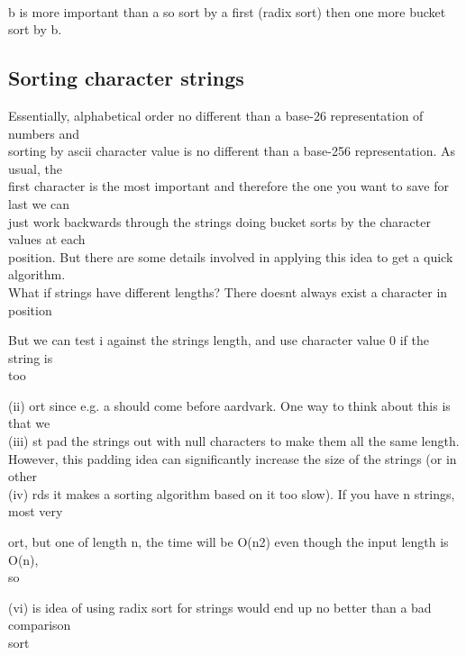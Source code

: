 \documentclass[a4paper,11pt]{article}
\begin{document}
\begin{flushleft}
{\\ }
{
b is more important than a so sort by a first (radix sort) then one more bucket sort by b.
\\ \subsection{Sorting character strings}
}
{
\raggedleft
Essentially, alphabetical order no different than a base-26 representation of numbers and
\\ sorting by ascii character value is no different than a base-256 representation. As usual, the
\\ first character is the most important and therefore the one you want to save for last we can
\\ just work backwards through the strings doing bucket sorts by the character values at each
\\ position. But there are some details involved in applying this idea to get a quick algorithm.
\\ What if strings have different lengths? There doesnt always exist a character in position
\\ }
{
}
\begin{enumerate}[label = (\alph*)]{
\item
But we can test i against the strings length, and use character value 0 if the string is
\\ too
}\end{enumerate}
{
\raggedleft
(ii) ort since e.g. a should come before aardvark. One way to think about this is that we
\\ }
{
(iii) st pad the strings out with null characters to make them all the same length.
\\ }
{
\raggedleft
However, this padding idea can significantly increase the size of the strings (or in other
\\ (iv) rds it makes a sorting algorithm based on it too slow). If you have n strings, most very
\\ }
{
}
\begin{enumerate}[label = (\alph*)]{
\item
ort, but one of length n, the time will be O(n2) even though the input length is O(n),
\\ so
}\end{enumerate}
{
\centering
(vi) is idea of using radix sort for strings would end up no better than a bad comparison
\\ }
{
sort
}
\end{flushleft}
\end{document}
